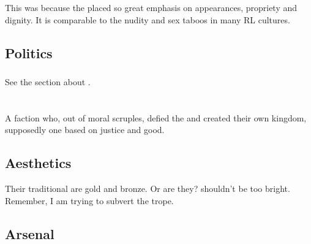 This was because the \CiriathSepher placed so great emphasis on appearances, propriety and dignity. 
It is comparable to the nudity and sex taboos in many RL cultures. 









\subsection{Politics}





\subsubsection{\Azraid}
See the section about .















\section{\Kezerad}
A \resphan{} faction who, out of moral scruples, defied the \banes{} and created their own kingdom, supposedly one based on justice and good. 









\subsection{Aesthetics}
Their traditional \colours are gold and bronze. 
Or are they? 
\Kezerad{} shouldn't be too bright. 
Remember, I am trying to subvert the  trope. 







\subsection{Arsenal}





